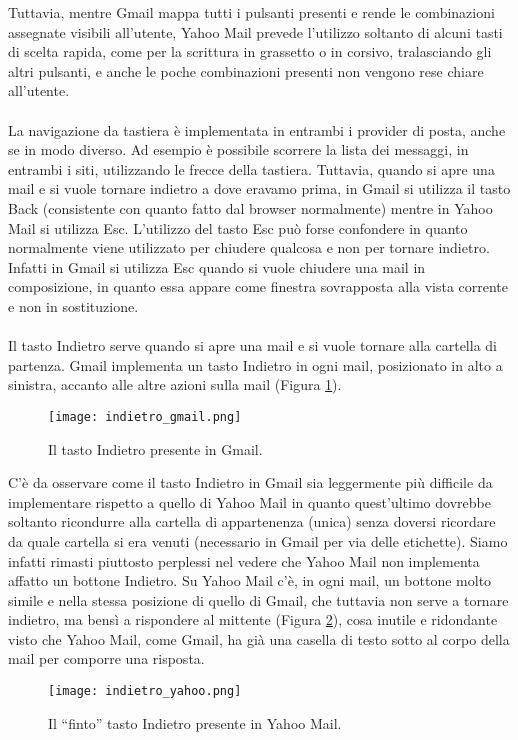 		Tuttavia, mentre Gmail mappa tutti i pulsanti presenti e rende le combinazioni assegnate visibili all'utente, Yahoo Mail prevede l'utilizzo soltanto di alcuni tasti di scelta rapida, come per la scrittura in grassetto o in corsivo, tralasciando gli altri pulsanti, e anche le poche combinazioni presenti non vengono rese chiare all'utente.\\
		\\
		La navigazione da tastiera è implementata in entrambi i provider di posta, anche se in modo diverso. Ad esempio è possibile scorrere la lista dei messaggi, in entrambi i siti, utilizzando le frecce della tastiera. Tuttavia, quando si apre una mail e si vuole tornare indietro a dove eravamo prima, in Gmail si utilizza il tasto Back (consistente con quanto fatto dal browser normalmente) mentre in Yahoo Mail si utilizza Esc. L'utilizzo del tasto Esc può forse confondere in quanto normalmente viene utilizzato per chiudere qualcosa e non per tornare indietro. Infatti in Gmail si utilizza Esc quando si vuole chiudere una mail in composizione, in quanto essa appare come finestra sovrapposta alla vista corrente e non in sostituzione.\\
		\\
		Il tasto Indietro serve quando si apre una mail e si vuole tornare alla cartella di partenza. Gmail implementa un tasto Indietro in ogni mail, posizionato in alto a sinistra, accanto alle altre azioni sulla mail (Figura \ref{fig:indietro_gmail}).
		\begin{figure}[h!]
			\begin{center}
				\texttt{[image: indietro\_gmail.png]}
			\end{center}
			\caption[Tasto Indietro in Gmail]{Il tasto Indietro presente in Gmail.}
			\label{fig:indietro_gmail}
		\end{figure}
		
		C'è da osservare come il tasto Indietro in Gmail sia leggermente più difficile da implementare rispetto a quello di Yahoo Mail in quanto quest'ultimo dovrebbe soltanto ricondurre alla cartella di appartenenza (unica) senza doversi ricordare da quale cartella si era venuti (necessario in Gmail per via delle etichette). Siamo infatti rimasti piuttosto perplessi nel vedere che Yahoo Mail non implementa affatto un bottone Indietro. Su Yahoo Mail c'è, in ogni mail, un bottone molto simile e nella stessa posizione di quello di Gmail, che tuttavia non serve a tornare indietro, ma bensì a rispondere al mittente (Figura \ref{fig:indietro_yahoo}), cosa inutile e ridondante visto che Yahoo Mail, come Gmail, ha già una casella di testo sotto al corpo della mail per comporre una risposta.
		\begin{figure}[h!]
			\begin{center}
				\texttt{[image: indietro\_yahoo.png]}
			\end{center}
			\caption[Finto tasto Indietro in Yahoo Mail]{Il ``finto'' tasto Indietro presente in Yahoo Mail.}
			\label{fig:indietro_yahoo}
		\end{figure}
		
